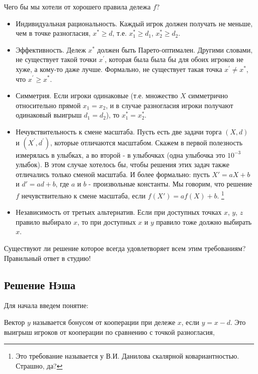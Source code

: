 Чего бы мы хотели от хорошего правила дележа $f$?
\begin{itemize}
\item 
{} \label{irationality}
Индивидуальная рациональность.  Каждый игрок должен получать не меньше,
чем в точке разногласия, $x^{*}\geq d$, т.е. $x_{1}^{*}\geq d_{1}$,
$x_{2}^{*}\geq d_{2}$.
\item Эффективность. Дележ $x^{*}$ должен быть Парето-оптимален. Другими
словами, не существует такой точки $x^{'}$, которая была была бы
для обоих игроков не хуже, а кому-то даже лучше. Формально, не существует
такая точка $x^{'}\neq x^{*}$, что $x^{'}\geq x^{*}$.
\item Симметрия.  Если игроки одинаковые (т.е. множество $X$ симметрично
относительно прямой $x_{1}=x_{2}$, и в случае разногласия игроки
получают одинаковый выигрыш $d_{1}=d_{2}$), то $x_{1}^{*}=x_{2}^{*}$.
\item 
{} \label{scale_invariance}
Нечувствительность к смене масштаба.  Пусть есть две задачи торга $(X,d)$
и $(X^{'},d^{'})$, которые отличаются масштабом. Скажем в первой
полезность измерялась в улыбках, а во второй - в улыбочках (одна улыбочка
это $10^{-3}$ улыбок). В этом случае хотелось бы, чтобы решения этих
задач также отличались только сменой масштаба. И более формально:
пусть $X'=aX+b$ и $d'=ad+b$, где $a$ и $b$ - произвольные константы.
Мы говорим, что решение $f$ нечувствительно к смене масштаба, если
$f(X')=af(X)+b$.%
\footnote{Это требование называется у В.И. Данилова скалярной ковариантностью.
Страшно, да?%
}
\item 
{} \label{3_invariance}
Независимость от третьих альтернатив.  Если при доступных точках $x$,
$y$, $z$ правило выбирало $x$, то при доступных $x$ и $y$ правило
тоже должно выбирать $x$.
\end{itemize}
Существуют ли решение которое всегда удовлетворяет всем этим требованиям?
Правильный ответ в студию!


\subsection{Решение Нэша}

Для начала введем понятие:

\begin{mydef}
Вектор $y$ называется бонусом от кооперации  при дележе $x$, если $y=x-d$.  Это выигрыш игроков от кооперации по сравнению с точкой разногласия,
\end{mydef}

